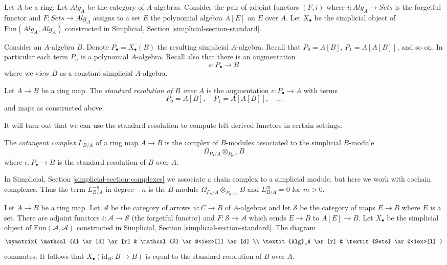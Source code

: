 \noindent
Let $A$ be a ring. Let $\textit{Alg}_A$ be the category of $A$-algebras.
Consider the pair of adjoint functors $(F, i)$ where
$i : \textit{Alg}_A \to \textit{Sets}$ is the forgetful functor and
$F : \textit{Sets} \to \textit{Alg}_A$ assigns to a set $E$ the polynomial
algebra $A[E]$ on $E$ over $A$. Let $X_\bullet$ be the simplicial object of
$\text{Fun}(\textit{Alg}_A, \textit{Alg}_A)$ constructed in
Simplicial, Section \ref{simplicial-section-standard}.

\medskip\noindent
Consider an $A$-algebra $B$. Denote $P_\bullet = X_\bullet(B)$ the resulting
simplicial $A$-algebra. Recall that $P_0 = A[B]$, $P_1 = A[A[B]]$, and so on.
In particular each term $P_n$ is a polynomial $A$-algebra.
Recall also that there is an augmentation
$$
\epsilon : P_\bullet \longrightarrow B
$$
where we view $B$ as a constant simplicial $A$-algebra.

\begin{definition}
\label{definition-standard-resolution}
Let $A \to B$ be a ring map. The {\it standard resolution of $B$ over $A$}
is the augmentation $\epsilon : P_\bullet \to A$ with terms
$$
P_0 = A[B],\quad P_1 = A[A[B]],\quad \ldots
$$
and maps as constructed above.
\end{definition}

\noindent
It will turn out that we can use the standard resolution
to compute left derived functors in certain settings.

\begin{definition}
\label{definition-cotangent-complex-ring-map}
The {\it cotangent complex} $L_{B/A}$ of a ring map $A \to B$
is the complex of $B$-modules associated to the simplicial $B$-module
$$
\Omega_{P_\bullet/A} \otimes_{P_\bullet, \epsilon} B
$$
where $\epsilon : P_\bullet \to B$ is the standard resolution
of $B$ over $A$.
\end{definition}

\noindent
In Simplicial, Section \ref{simplicial-section-complexes} we associate a
chain complex to a simplicial module, but here we work with cochain complexes.
Thus the term $L_{B/A}^{-n}$ in degree $-n$ is the $B$-module
$\Omega_{P_n/A} \otimes_{P_n, \epsilon_n} B$ and $L_{B/A}^m = 0$
for $m > 0$.

\begin{remark}
\label{remark-variant-cotangent-complex}
Let $A \to B$ be a ring map. Let $\mathcal{A}$ be the category of
arrows $\psi : C \to B$ of $A$-algebras and let $\mathcal{S}$ be
the category of maps $E \to B$ where $E$ is a set. There are adjoint
functors $i : \mathcal{A} \to \mathcal{S}$ (the forgetful functor)
and $F : \mathcal{S} \to \mathcal{A}$ which sends $E \to B$ to
$A[E] \to B$. Let $X_\bullet$ be the simplicial object of
$\text{Fun}(\mathcal{A}, \mathcal{A})$ constructed in
Simplicial, Section \ref{simplicial-section-standard}.
The diagram
$$
\xymatrix{
\mathcal{A} \ar[d] \ar[r] & \mathcal{S} \ar@<1ex>[l] \ar[d] \\
\textit{Alg}_A \ar[r] & \textit{Sets} \ar@<1ex>[l]
}
$$
commutes. It follows that $X_\bullet(\text{id}_B : B \to B)$
is equal to the standard resolution of $B$ over $A$.
\end{remark}

